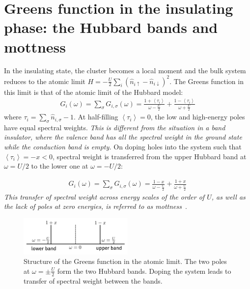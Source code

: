 \documentclass[reprint,hidelinks,onecolumn]{revtex4-2}
\begin{document}
\section{Greens function in the insulating phase: the Hubbard bands and mottness}
In the insulating state, the cluster becomes a local moment and the bulk system reduces to the atomic limit \(H = -\frac{U}{2}\sum_i\left(\hat n_{i \uparrow} - \hat n_{i \downarrow}\right)^2\). The Greens function in this limit is that of the atomic limit of the Hubbard model:
\begin{equation}\begin{aligned}
	G_{i}(\omega) = \sum_\sigma G_{i,\sigma}(\omega) = \frac{1 + \left<\tau_{i }\right>}{\omega - \frac{U}{2}} + \frac{1 - \left<\tau_{i}\right>}{\omega + \frac{U}{2}}
\end{aligned}\end{equation}
where \(\tau_i = \sum_\sigma \hat n_{i,\sigma} - 1\). At half-filling \(\left<\tau_{i}\right>=0\), the low and high-energy poles have equal spectral weights. \textit{This is different from the situation in a band insulator, where the valence band has all the spectral weight in the ground state while the conduction band is empty.} On doping holes into the system such that \(\left<\tau_{i}\right> = -x < 0\), spectral weight is transferred from the upper Hubbard band at \(\omega = U/2\) to the lower one at \(\omega = -U/2\):

\begin{equation}\begin{aligned}
	G_{i}(\omega) = \sum_\sigma G_{i,\sigma}(\omega) = \frac{1 - x}{\omega - \frac{U}{2}} + \frac{1 + x}{\omega + \frac{U}{2}}
\end{aligned}\end{equation}
\textit{This transfer of spectral weight across energy scales of the order of \(U\), as well as the lack of poles at zero energies, is referred to as mottness}~\cite{phillips2006mottness}.
\begin{figure}[!htb]
	\centering
	\includegraphics[width=0.5\textwidth]{hubbard_bands.pdf}
	\caption{Structure of the Greens function in the atomic limit. The two poles at \(\omega = \pm \frac{U}{2}\) form the two Hubbard bands. Doping the system leads to transfer of spectral weight between the bands.}
\end{figure}
\end{document}
